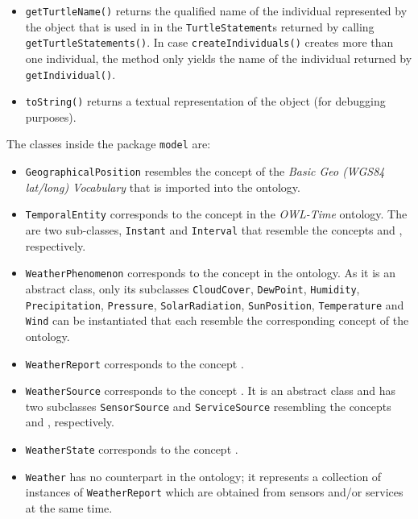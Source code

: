 \begin{itemize}
  \item \texttt{getTurtleName()} returns the qualified name of the individual represented by the object that is used in in the \texttt{TurtleStatement}s returned by calling \texttt{getTurtleStatements()}. In case \texttt{createIndividuals()} creates more than one individual, the method only yields the name of the individual returned by \texttt{getIndividual()}.
  
  \item \texttt{toString()} returns a textual representation of the object (for debugging purposes).
\end{itemize}

The classes inside the package \texttt{model} are:
\begin{itemize}
  \item \texttt{GeographicalPosition} resembles the concept  of the \emph{Basic Geo (WGS84 lat/long) Vocabulary}\cite{wgs84_vocabulary} that is imported into the \thinkhomeweather ontology.
  
  \item \texttt{TemporalEntity} corresponds to the concept  in the \emph{OWL-Time}\cite{owl-time} ontology. The are two sub-classes, \texttt{Instant} and \texttt{Interval} that resemble the concepts  and , respectively.
  
  \item \texttt{WeatherPhenomenon} corresponds to the concept  in the \thinkhomeweather ontology. As it is an abstract class, only its subclasses \texttt{CloudCover}, \texttt{DewPoint}, \texttt{Humidity}, \texttt{Precipitation}, \texttt{Pressure}, \texttt{SolarRadiation}, \texttt{SunPosition}, \texttt{Temperature} and \texttt{Wind} can be instantiated that each resemble the corresponding concept of the ontology.
  
  \item \texttt{WeatherReport} corresponds to the concept .
  
  \item \texttt{WeatherSource} corresponds to the concept . It is an abstract class and has two subclasses \texttt{SensorSource} and \texttt{ServiceSource} resembling the concepts  and , respectively.
  
  \item \texttt{WeatherState} corresponds to the concept .
  
  \item \texttt{Weather} has no counterpart in the ontology; it represents a collection of instances of \texttt{WeatherReport} which are obtained from sensors and/or services at the same time.
\end{itemize}

